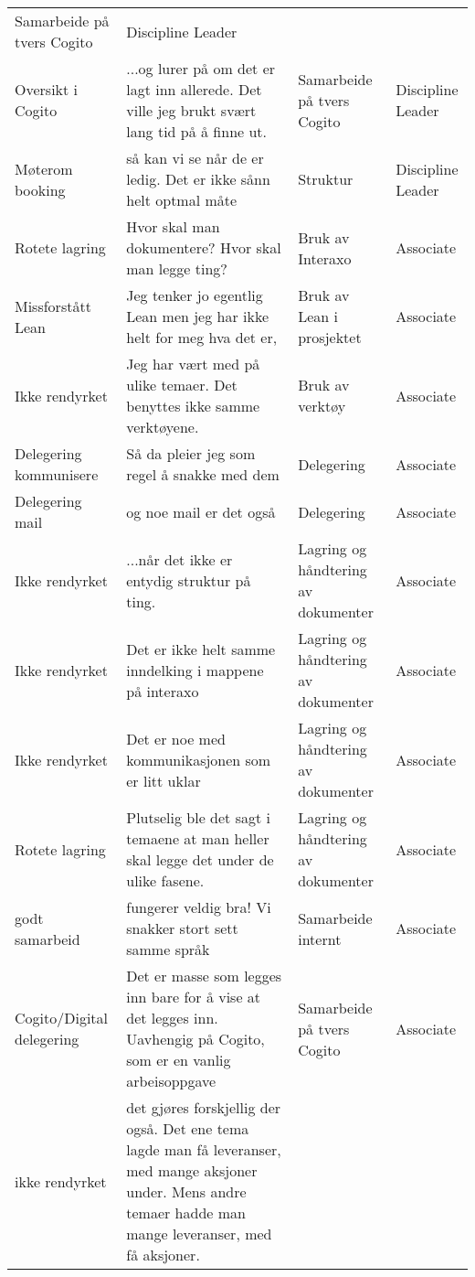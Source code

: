 \begin{landscape}
\begin{longtable}{p{0.25\textheight}p{0.5\textheight}p{0.25\textheight}p{0.25\textheight}}
      Samarbeide på tvers Cogito &
      Discipline Leader \\
    Oversikt i Cogito &
      ...og lurer på om det er lagt inn allerede. Det ville jeg brukt svært lang tid på å finne ut. &
      Samarbeide på tvers Cogito &
      Discipline Leader \\
    Møterom booking &
      så kan vi se når de er ledig. Det er ikke sånn helt optmal måte &
      Struktur &
      Discipline Leader \\
    Rotete lagring &
      Hvor skal man dokumentere? Hvor skal man legge ting? &
      Bruk av Interaxo &
      Associate \\
    Missforstått Lean &
      Jeg tenker jo egentlig Lean men jeg har ikke helt for meg hva det er, &
      Bruk av Lean i prosjektet &
      Associate \\
    Ikke rendyrket &
      Jeg har vært med på ulike temaer. Det benyttes ikke samme verktøyene. &
      Bruk av verktøy &
      Associate \\
    Delegering kommunisere &
      Så da pleier jeg som regel å snakke med dem &
      Delegering &
      Associate \\
    Delegering mail &
      og noe mail er det også &
      Delegering &
      Associate \\
    Ikke rendyrket &
      ...når det ikke er entydig struktur på ting. &
      Lagring og håndtering av dokumenter &
      Associate \\
    Ikke rendyrket &
      Det er ikke helt samme inndelking i mappene på interaxo &
      Lagring og håndtering av dokumenter &
      Associate \\
    Ikke rendyrket &
      Det er noe med kommunikasjonen som er litt uklar &
      Lagring og håndtering av dokumenter &
      Associate \\
    Rotete lagring &
      Plutselig ble det sagt i temaene at man heller skal legge det under de ulike fasene. &
      Lagring og håndtering av dokumenter &
      Associate \\
    godt samarbeid &
      fungerer veldig bra! Vi snakker stort sett samme språk &
      Samarbeide internt &
      Associate \\
    Cogito/Digital delegering &
      Det er masse som legges inn bare for å vise at det legges inn. Uavhengig på Cogito, som er en vanlig arbeisoppgave &
      Samarbeide på tvers Cogito &
      Associate \\
    ikke rendyrket &
      det gjøres forskjellig der også. Det ene tema lagde man få leveranser, med mange aksjoner under. Mens andre temaer hadde man mange leveranser, med få aksjoner. &

\end{longtable}
\end{landscape}
